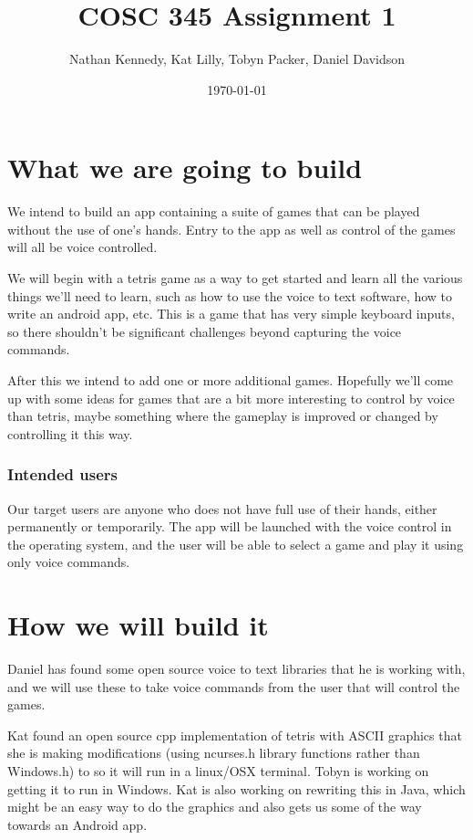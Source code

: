 \documentclass[11pt, oneside]{article}
\title{COSC 345 Assignment 1}
\author{Nathan Kennedy, Kat Lilly, Tobyn Packer, Daniel Davidson}
\date{\today}
\begin{document}
\maketitle

\section*{What we are going to build}

We intend to build an app containing a suite of games that can be
played without the use of one's hands. Entry to the app as well as
control of the games will all be voice controlled.

We will begin with a tetris game as a way to get started and learn all
the various things we'll need to learn, such as how to use the voice
to text software, how to write an android app, etc. This is a game
that has very simple keyboard inputs, so there shouldn't be
significant challenges beyond capturing the voice commands.

After this we intend to add one or more additional games. Hopefully
we'll come up with some ideas for games that are a bit more
interesting to control by voice than tetris, maybe something where the
gameplay is improved or changed by controlling it this way.

\subsubsection*{Intended users}

Our target users are anyone who does not have full use of their hands,
either permanently or temporarily. The app will be launched with the
voice control in the operating system, and the user will be able to
select a game and play it using only voice commands.

\section*{How we will build it}

Daniel has found some open source voice to text libraries that he is
working with, and we will use these to take voice commands from the
user that will control the games.

Kat found an open source cpp implementation of tetris with ASCII
graphics that she is making modifications (using ncurses.h library
functions rather than Windows.h) to so it will run in a linux/OSX
terminal. Tobyn is working on getting it to run in Windows. Kat is
also working on rewriting this in Java, which might be an easy way to
do the graphics and also gets us some of the way towards an Android
app.
\end{document}
